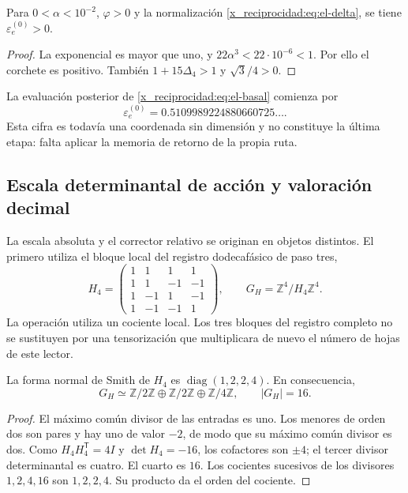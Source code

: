\begin{proposition}
Para \(0<\alpha<10^{-2}\), \(\varphi>0\) y la normalización
\eqref{x_reciprocidad:eq:el-delta}, se tiene \(\varepsilon_e^{(0)}>0\).
\end{proposition}
\begin{proof}
La exponencial es mayor que uno, y
\(22\alpha^3<22\cdot10^{-6}<1\). Por ello el corchete es positivo.
También \(1+15\Delta_4>1\) y \(\sqrt3/4>0\).
\end{proof}

La evaluación posterior de \eqref{x_reciprocidad:eq:el-basal} comienza por
\[
 \varepsilon_e^{(0)}=0.5109989224880660725\ldots.
\]
Esta cifra es todavía una coordenada sin dimensión y no constituye la
última etapa: falta aplicar la memoria de retorno de la propia ruta.

\subsection{Escala determinantal de acción y valoración decimal}

La escala absoluta y el corrector relativo se originan en objetos
distintos. El primero utiliza el bloque local del registro dodecafásico
de paso tres,
\begin{equation}
 H_4=\begin{pmatrix}
 1&1&1&1\\1&1&-1&-1\\1&-1&1&-1\\1&-1&-1&1
 \end{pmatrix},\qquad
 G_H=\mathbb Z^4/H_4\mathbb Z^4.
 \label{x_reciprocidad:eq:el-h4}
\end{equation}
La operación utiliza un cociente local. Los tres bloques del registro
completo no se sustituyen por una tensorización que multiplicara de
nuevo el número de hojas de este lector.

\begin{lemma}
La forma normal de Smith de \(H_4\) es
\(\operatorname{diag}(1,2,2,4)\). En consecuencia,
\[
 G_H\simeq\mathbb Z/2\mathbb Z\oplus\mathbb Z/2\mathbb Z
 \oplus\mathbb Z/4\mathbb Z,\qquad |G_H|=16.
\]
\end{lemma}
\begin{proof}
El máximo común divisor de las entradas es uno. Los menores de orden dos
son pares y hay uno de valor \(-2\), de modo que su máximo común divisor
es dos. Como \(H_4H_4^{\mathsf T}=4I\) y \(\det H_4=-16\), los
cofactores son \(\pm4\); el tercer divisor determinantal es cuatro.
El cuarto es \(16\). Los cocientes sucesivos de los divisores
\(1,2,4,16\) son \(1,2,2,4\). Su producto da el orden del cociente.
\end{proof}

